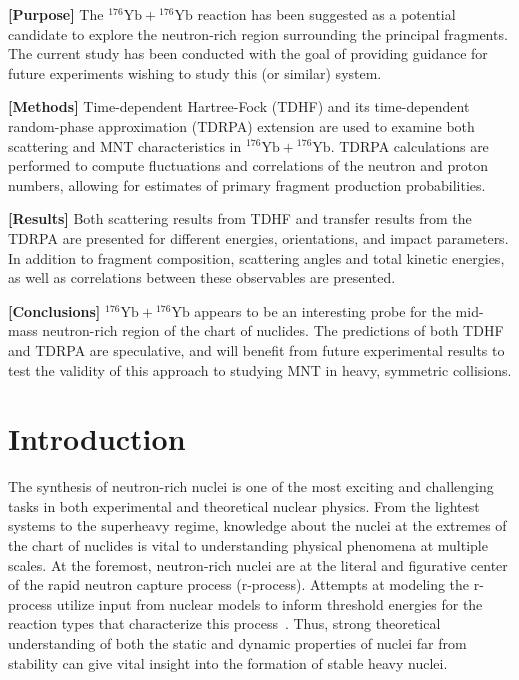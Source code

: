 		{\bf [Purpose]}
		The $^{176}\mathrm{Yb}+{}^{176}\mathrm{Yb}$ reaction has been suggested as a potential candidate to explore the neutron-rich region surrounding the principal fragments. The current study has been conducted with the goal of providing guidance for future experiments wishing to study this (or similar) system.
		
		{\bf [Methods]}
		Time-dependent Hartree-Fock (TDHF) and its time-dependent random-phase approximation (TDRPA) extension are used to examine both scattering and MNT characteristics in $^{176}\mathrm{Yb}+{}^{176}\mathrm{Yb}$. TDRPA calculations are performed to compute fluctuations and correlations of the neutron and proton numbers, allowing for estimates of primary fragment production probabilities. 
		
		{\bf [Results]}
		Both scattering results from TDHF and transfer results from the TDRPA are presented for different energies, orientations, and impact parameters.
		In addition to fragment composition, scattering angles and total kinetic energies, as well as correlations between these observables are presented.
		
		{\bf [Conclusions]}
		$^{176}\mathrm{Yb}+{}^{176}\mathrm{Yb}$ appears to be an interesting probe for the mid-mass neutron-rich region of the chart of nuclides. The predictions of both TDHF and TDRPA are speculative, and will benefit from future experimental results to test the validity of this approach to studying MNT in heavy, symmetric collisions.


\section{Introduction}

The synthesis of neutron-rich nuclei is one of the most exciting and challenging tasks in both experimental and theoretical nuclear physics.
From the lightest systems to the superheavy regime, knowledge about the nuclei at the extremes of the chart of nuclides is vital to understanding physical phenomena at multiple scales.
At the foremost, neutron-rich nuclei are at the literal and figurative center of the rapid neutron capture process (r-process).
Attempts at modeling the r-process utilize input from nuclear models to inform threshold energies for the reaction types that characterize this process~\citep{cowan2020}.
Thus, strong theoretical understanding of both the static and dynamic properties of nuclei far from stability can give vital insight into the formation of stable heavy nuclei.


